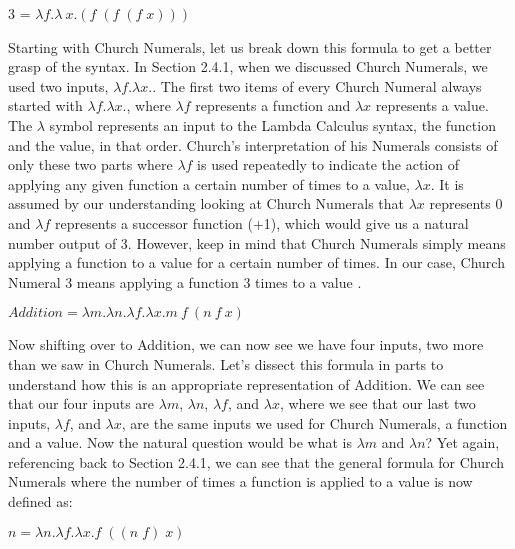\documentclass{article}
\begin{document}
\begin{center}
 3 = $\lambda f. \lambda\ x.(f \; (f \; (f \; x)))$ \\
\end{center}

\noindent 
Starting with Church Numerals, let us break down this formula to get a better grasp of the syntax. In Section 2.4.1, when we discussed Church Numerals, we used two inputs, $\lambda f.\lambda x.$. The first two items of every Church Numeral always started with $\lambda f.\lambda x.$, where $\lambda f$ represents a function and $\lambda x$ represents a value. The $\lambda$ symbol represents an input to the Lambda Calculus syntax, the function and the value, in that order. Church's interpretation of his Numerals consists of only these two parts where $\lambda f$ is used repeatedly to indicate the action of applying any given function a certain number of times to a value, $\lambda x$. It is assumed by our understanding looking at Church Numerals that $\lambda x$ represents 0 and $\lambda f$ represents a successor function (+1), which would give us a natural number output of 3. However, keep in mind that Church Numerals simply means applying a function to a value for a certain number of times. In our case, Church Numeral 3 means applying a function 3 times to a value \cite{CE}.

\begin{center}
 $ Addition = \lambda m.\lambda n.\lambda f.\lambda x. m\ f\ (n\ f\ x)$ \\
\end{center}

\medskip\noindent
Now shifting over to Addition, we can now see we have four inputs, two more than we saw in Church Numerals. Let's dissect this formula in parts to understand how this is an appropriate representation of Addition. We can see that our four inputs are $\lambda m$, $\lambda n$, $\lambda f$, and $\lambda x$, where we see that our last two inputs, $\lambda f$, and $\lambda x$, are the same inputs we used for Church Numerals, a function and a value. Now the natural question would be what is $\lambda m$ and $\lambda n$? Yet again, referencing back to Section 2.4.1, we can see that the general formula for Church Numerals where the number of times a function is applied to a value is now defined as:

\begin{center}
   $ n = \lambda n. \lambda f. \lambda x.f \; ((n \; f) \; x)$
\end{center}
\end{document}
